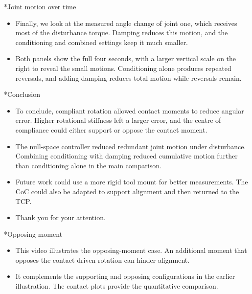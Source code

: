 \documentclass[12pt,a4paper]{article}
\makeatletter
\renewcommand\section{\@startsection{section}{1}{0pt}{14pt}{6pt}{\normalfont\Large\bfseries\color{navy}}}
\makeatother
\begin{document}
\section*{Joint motion over time}
\begin{itemize}
\item Finally, we look at the measured angle change of joint one, which receives most of the disturbance torque. Damping reduces this motion, and the conditioning and combined settings keep it much smaller.
\item Both panels show the full four seconds, with a larger vertical scale on the right to reveal the small motions. Conditioning alone produces repeated reversals, and adding damping reduces total motion while reversals remain.
\end{itemize}

\section*{Conclusion}
\begin{itemize}
\item To conclude, compliant rotation allowed contact moments to reduce angular error. Higher rotational stiffness left a larger error, and the centre of compliance could either support or oppose the contact moment.
\item The null-space controller reduced redundant joint motion under disturbance. Combining conditioning with damping reduced cumulative motion further than conditioning alone in the main comparison.
\item Future work could use a more rigid tool mount for better measurements. The CoC could also be adapted to support alignment and then returned to the TCP.
\item Thank you for your attention.
\end{itemize}

\section*{Opposing moment}
\begin{itemize}
\item This video illustrates the opposing-moment case. An additional moment that opposes the contact-driven rotation can hinder alignment.
\item It complements the supporting and opposing configurations in the earlier illustration. The contact plots provide the quantitative comparison.
\end{itemize}
\end{document}
